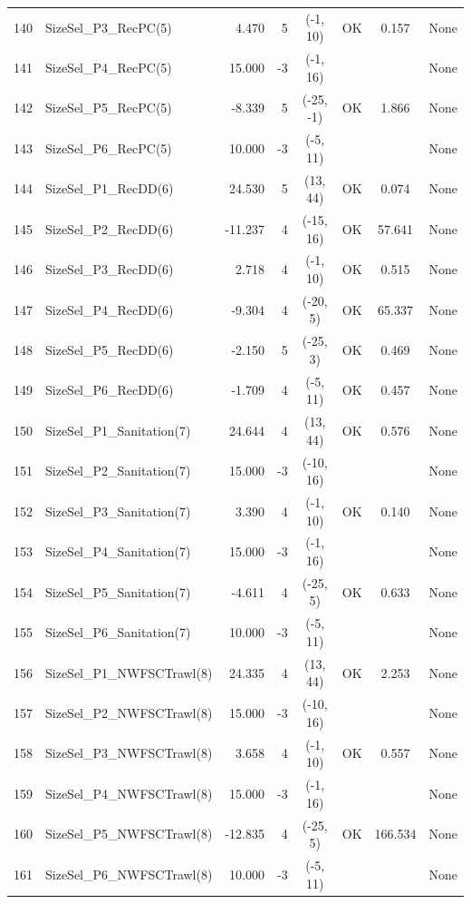 \documentclass[12pt,]{article}
\begin{document}
\begin{landscape}
\begin{longtable}{rlrrcccl}
  140 & SizeSel\_P3\_RecPC(5) & 4.470 & 5 & (-1, 10) & OK & 0.157 & None \\ 
  141 & SizeSel\_P4\_RecPC(5) & 15.000 & -3 & (-1, 16) &  &  & None \\ 
  142 & SizeSel\_P5\_RecPC(5) & -8.339 & 5 & (-25, -1) & OK & 1.866 & None \\ 
  143 & SizeSel\_P6\_RecPC(5) & 10.000 & -3 & (-5, 11) &  &  & None \\ 
  144 & SizeSel\_P1\_RecDD(6) & 24.530 & 5 & (13, 44) & OK & 0.074 & None \\ 
  145 & SizeSel\_P2\_RecDD(6) & -11.237 & 4 & (-15, 16) & OK & 57.641 & None \\ 
  146 & SizeSel\_P3\_RecDD(6) & 2.718 & 4 & (-1, 10) & OK & 0.515 & None \\ 
  147 & SizeSel\_P4\_RecDD(6) & -9.304 & 4 & (-20, 5) & OK & 65.337 & None \\ 
  148 & SizeSel\_P5\_RecDD(6) & -2.150 & 5 & (-25, 3) & OK & 0.469 & None \\ 
  149 & SizeSel\_P6\_RecDD(6) & -1.709 & 4 & (-5, 11) & OK & 0.457 & None \\ 
  150 & SizeSel\_P1\_Sanitation(7) & 24.644 & 4 & (13, 44) & OK & 0.576 & None \\ 
  151 & SizeSel\_P2\_Sanitation(7) & 15.000 & -3 & (-10, 16) &  &  & None \\ 
  152 & SizeSel\_P3\_Sanitation(7) & 3.390 & 4 & (-1, 10) & OK & 0.140 & None \\ 
  153 & SizeSel\_P4\_Sanitation(7) & 15.000 & -3 & (-1, 16) &  &  & None \\ 
  154 & SizeSel\_P5\_Sanitation(7) & -4.611 & 4 & (-25, 5) & OK & 0.633 & None \\ 
  155 & SizeSel\_P6\_Sanitation(7) & 10.000 & -3 & (-5, 11) &  &  & None \\ 
  156 & SizeSel\_P1\_NWFSCTrawl(8) & 24.335 & 4 & (13, 44) & OK & 2.253 & None \\ 
  157 & SizeSel\_P2\_NWFSCTrawl(8) & 15.000 & -3 & (-10, 16) &  &  & None \\ 
  158 & SizeSel\_P3\_NWFSCTrawl(8) & 3.658 & 4 & (-1, 10) & OK & 0.557 & None \\ 
  159 & SizeSel\_P4\_NWFSCTrawl(8) & 15.000 & -3 & (-1, 16) &  &  & None \\ 
  160 & SizeSel\_P5\_NWFSCTrawl(8) & -12.835 & 4 & (-25, 5) & OK & 166.534 & None \\ 
  161 & SizeSel\_P6\_NWFSCTrawl(8) & 10.000 & -3 & (-5, 11) &  &  & None \\ 

\end{longtable}
\end{landscape}
\end{document}

